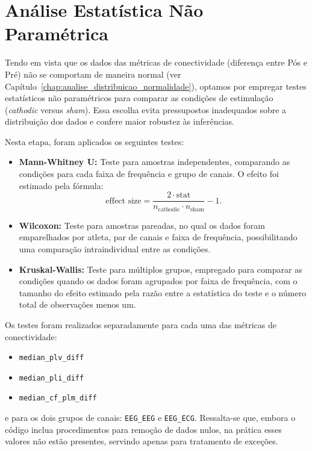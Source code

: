 \chapter{Análise Estatística Não Paramétrica}
\label{chap:analise_estatistica_np}

Tendo em vista que os dados das métricas de conectividade (diferença entre Pós e Pré) não se comportam de maneira normal (ver Capítulo~\ref{chap:analise_distribuicao_normalidade}), optamos por empregar testes estatísticos não paramétricos para comparar as condições de estimulação (\texorpdfstring{\textit{cathodic} versus \textit{sham}}{cathodic versus sham}). Essa escolha evita pressupostos inadequados sobre a distribuição dos dados e confere maior robustez às inferências.

Nesta etapa, foram aplicados os seguintes testes:
\begin{itemize}
    \item \textbf{Mann-Whitney U:} Teste para amostras independentes, comparando as condições para cada faixa de frequência e grupo de canais. O efeito foi estimado pela fórmula:
    \[
    \text{effect size} = \frac{2\cdot \text{stat}}{n_{\text{cathodic}} \cdot n_{\text{sham}}} - 1.
    \]
    \item \textbf{Wilcoxon:} Teste para amostras pareadas, no qual os dados foram emparelhados por atleta, par de canais e faixa de frequência, possibilitando uma comparação intraindividual entre as condições.
    \item \textbf{Kruskal-Wallis:} Teste para múltiplos grupos, empregado para comparar as condições quando os dados foram agrupados por faixa de frequência, com o tamanho do efeito estimado pela razão entre a estatística do teste e o número total de observações menos um.
\end{itemize}

Os testes foram realizados separadamente para cada uma das métricas de conectividade:
\begin{itemize}
    \item \texorpdfstring{\texttt{median\_plv\_diff}}{median_plv_diff}
    \item \texorpdfstring{\texttt{median\_pli\_diff}}{median_pli_diff}
    \item \texorpdfstring{\texttt{median\_cf\_plm\_diff}}{median_cf_plm_diff}
\end{itemize}
e para os dois grupos de canais: \texorpdfstring{\texttt{EEG\_EEG}}{EEG_EEG} e \texorpdfstring{\texttt{EEG\_ECG}}{EEG_ECG}. Ressalta-se que, embora o código inclua procedimentos para remoção de dados nulos, na prática esses valores não estão presentes, servindo apenas para tratamento de exceções.

